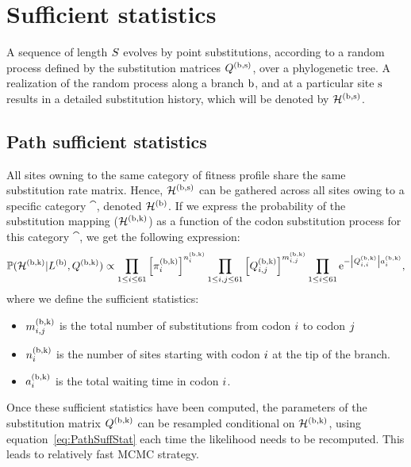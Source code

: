 \section{Sufficient statistics}
\label{sec:sufficient-statistics-mutselne}

A sequence of length $S$ evolves by point substitutions, according to a random process defined by the substitution matrices $Q^{(\text{b}, \text{s})}$, over a phylogenetic tree.
A realization of the random process along a branch $\text{b}$, and at a particular site $\text{s}$ results in a detailed substitution history, which will be denoted by $\mathcal{H}^{(\text{b}, \text{s})}$.

\subsection{Path sufficient statistics}
All sites owning to the same category of fitness profile share the same substitution rate matrix.
Hence, $\mathcal{H}^{(\text{b}, \text{s})}$ can be gathered across all sites owing to a specific category $\cat$, denoted $\mathcal{H}^{(\text{b})}$.
If we express the probability of the substitution mapping ($\mathcal{H}^{(\text{b}, \text{k})}$) as a function of the codon substitution process for this category $\cat$, we get the following expression:
\begin{equation}
    \label{eq:PathSuffStat}
    \mathbb{P} (\mathcal{H}^{(\text{b}, \text{k})} | L^{(\text{b})}, Q^{(\text{b}, \text{k})}) \propto \prod_{1 \leq {i} \leq 61} \left[\pi_{{i}}^{(\text{b}, \text{k})}\right]^{n_{{i}}^{(\text{b}, \text{k})}} \prod_{ 1 \leq {i}, {j} \leq 61} \left[Q^{(\text{b}, \text{k})}_{{i}, {j}}\right]^{m_{{i}, {j}}^{(\text{b}, \text{k})}} \prod_{1 \leq {i} \leq 61} \text{e}^{- \left| Q^{(\text{b}, \text{k})}_{{i}, {i}}\right| a_{{i}}^{(\text{b}, \text{k})}},
\end{equation}
where we define the sufficient statistics:
\begin{itemize}
    \setlength\itemsep{-0.25em}
    \item $m_{{i}, {j}}^{(\text{b}, \text{k})}$ is the total number of substitutions from codon ${i}$ to codon ${j}$
    \item $n_{{i}}^{(\text{b}, \text{k})}$ is the number of sites starting with codon ${i}$ at the tip of the branch.
    \item $a_{{i}}^{(\text{b}, \text{k})}$ is the total waiting time in codon ${i}$.
\end{itemize}
Once these sufficient statistics have been computed, the parameters of the substitution matrix $Q^{(\text{b}, \text{k})}$ can be resampled conditional on $\mathcal{H}^{(\text{b}, \text{k})}$,
using equation~\ref{eq:PathSuffStat} each time the likelihood needs to be recomputed. This leads to relatively fast \acrshort{MCMC} strategy.

